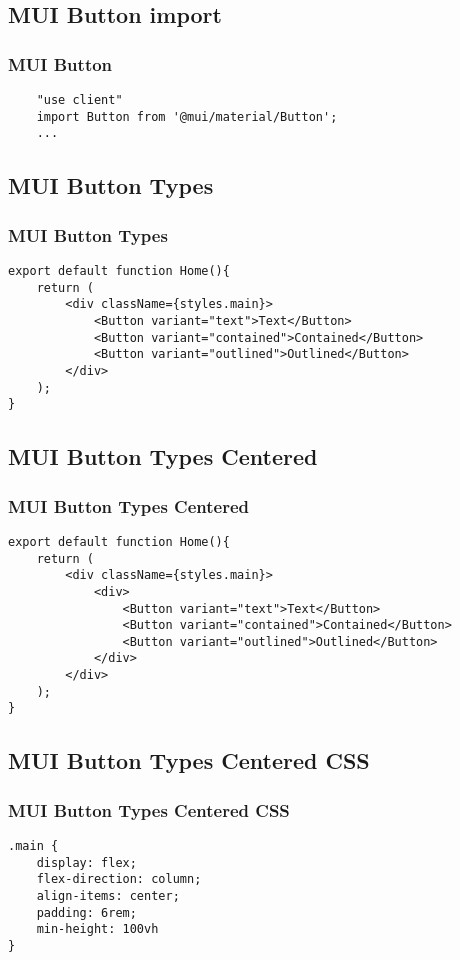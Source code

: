 \documentclass{beamer}
\begin{document}
\subsection{MUI Button import}
\begin{frame}[fragile]
\frametitle{MUI Button}
\begin{lstlisting}
    "use client"
    import Button from '@mui/material/Button';
    ...
\end{lstlisting}
\end{frame}

\subsection{MUI Button Types}
\begin{frame}[fragile]
\frametitle{MUI Button Types}
\begin{lstlisting}
export default function Home(){
    return (
        <div className={styles.main}>
            <Button variant="text">Text</Button>
            <Button variant="contained">Contained</Button>
            <Button variant="outlined">Outlined</Button>
        </div>
    );
}
\end{lstlisting}
\end{frame}

\subsection{MUI Button Types Centered}
\begin{frame}[fragile]
\frametitle{MUI Button Types Centered}
\begin{lstlisting}
export default function Home(){
    return (
        <div className={styles.main}>
            <div>
                <Button variant="text">Text</Button>
                <Button variant="contained">Contained</Button>
                <Button variant="outlined">Outlined</Button>
            </div>
        </div>
    );
}
\end{lstlisting}
\end{frame}

\subsection{MUI Button Types Centered CSS}
\begin{frame}[fragile]
\frametitle{MUI Button Types Centered CSS}
\begin{lstlisting}
.main {
    display: flex;
    flex-direction: column;
    align-items: center;
    padding: 6rem;
    min-height: 100vh
}
\end{lstlisting}
\end{frame}
\end{document}
